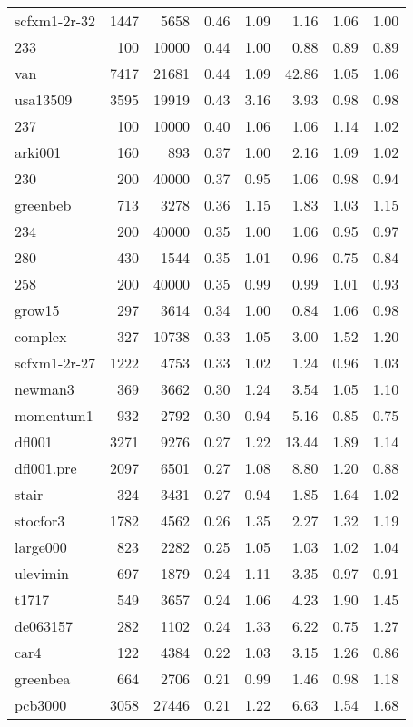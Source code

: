 \documentclass[10pt]{article}
\begin{document}
\begin{longtable}{|l|r|r|r|r|r|r|r|}
scfxm1-2r-32	&	1447	&	5658	&	0.46	&	1.09	&	1.16	&	1.06	&	1.00	\\
233	&	100	&	10000	&	0.44	&	1.00	&	0.88	&	0.89	&	0.89	\\
van	&	7417	&	21681	&	0.44	&	1.09	&	42.86	&	1.05	&	1.06	\\
usa13509	&	3595	&	19919	&	0.43	&	3.16	&	3.93	&	0.98	&	0.98	\\
237	&	100	&	10000	&	0.40	&	1.06	&	1.06	&	1.14	&	1.02	\\
arki001	&	160	&	893	&	0.37	&	1.00	&	2.16	&	1.09	&	1.02	\\
230	&	200	&	40000	&	0.37	&	0.95	&	1.06	&	0.98	&	0.94	\\
greenbeb	&	713	&	3278	&	0.36	&	1.15	&	1.83	&	1.03	&	1.15	\\
234	&	200	&	40000	&	0.35	&	1.00	&	1.06	&	0.95	&	0.97	\\
280	&	430	&	1544	&	0.35	&	1.01	&	0.96	&	0.75	&	0.84	\\
258	&	200	&	40000	&	0.35	&	0.99	&	0.99	&	1.01	&	0.93	\\
grow15	&	297	&	3614	&	0.34	&	1.00	&	0.84	&	1.06	&	0.98	\\
complex	&	327	&	10738	&	0.33	&	1.05	&	3.00	&	1.52	&	1.20	\\
scfxm1-2r-27	&	1222	&	4753	&	0.33	&	1.02	&	1.24	&	0.96	&	1.03	\\
newman3	&	369	&	3662	&	0.30	&	1.24	&	3.54	&	1.05	&	1.10	\\
momentum1	&	932	&	2792	&	0.30	&	0.94	&	5.16	&	0.85	&	0.75	\\
dfl001	&	3271	&	9276	&	0.27	&	1.22	&	13.44	&	1.89	&	1.14	\\
dfl001.pre	&	2097	&	6501	&	0.27	&	1.08	&	8.80	&	1.20	&	0.88	\\
stair	&	324	&	3431	&	0.27	&	0.94	&	1.85	&	1.64	&	1.02	\\
stocfor3	&	1782	&	4562	&	0.26	&	1.35	&	2.27	&	1.32	&	1.19	\\
large000	&	823	&	2282	&	0.25	&	1.05	&	1.03	&	1.02	&	1.04	\\
ulevimin	&	697	&	1879	&	0.24	&	1.11	&	3.35	&	0.97	&	0.91	\\
t1717	&	549	&	3657	&	0.24	&	1.06	&	4.23	&	1.90	&	1.45	\\
de063157	&	282	&	1102	&	0.24	&	1.33	&	6.22	&	0.75	&	1.27	\\
car4	&	122	&	4384	&	0.22	&	1.03	&	3.15	&	1.26	&	0.86	\\
greenbea	&	664	&	2706	&	0.21	&	0.99	&	1.46	&	0.98	&	1.18	\\
pcb3000	&	3058	&	27446	&	0.21	&	1.22	&	6.63	&	1.54	&	1.68	\\

\end{longtable}
\end{document}
